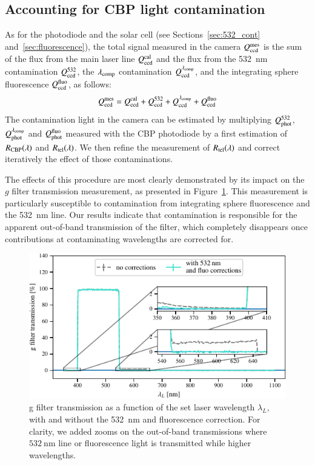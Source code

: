 \subsection{Accounting for CBP light contamination}\label{sec:sd_contaminations}

As for the photodiode and the solar cell (see Sections~\ref{sec:532_cont} and~\ref{sec:fluorescence}), the total signal measured in the \SD camera $Q_{\mathrm{ccd}}^{\mathrm{mes}}$ is the sum of the flux from the main laser line $Q_{\mathrm{ccd}}^{\mathrm{cal}}$ and the flux from the \SI{532}{\nm} contamination $Q_{\mathrm{ccd}}^{532}$, the $\lambda_{\rm comp}$ contamination $Q_{\mathrm{ccd}}^{\lambda_{\rm comp}}$, and the integrating sphere fluorescence $Q_{\mathrm{ccd}}^{\mathrm{fluo}}$, as follows:
\begin{equation}
    Q_{\mathrm{ccd}}^{\mathrm{mes}} = Q_{\mathrm{ccd}}^{\mathrm{cal}} + Q_{\mathrm{ccd}}^{532} + Q_{\mathrm{ccd}}^{\lambda_{\rm comp}} + Q_{\mathrm{ccd}}^{\mathrm{fluo}}
    \label{eq:qccd_mes}
\end{equation}
The contamination light in the \SD camera can be estimated by multiplying $Q_{\mathrm{phot}}^{532}$, $Q_{\mathrm{phot}}^{\lambda_{\rm comp}}$ and $Q_{\mathrm{phot}}^{\mathrm{fluo}}$ measured with the CBP photodiode by a first estimation of $R_{\mathrm{CBP}}(\lambda)$ and $R_{\mathrm{tel}}(\lambda)$. We then refine the measurement of $R_{\mathrm{tel}}(\lambda)$ and correct iteratively the effect of those contaminations.

The effects of this procedure are most clearly demonstrated by its impact on the \SD $g$ filter transmission measurement, as presented in Figure~\ref{fig:g_filter_532}. This measurement is particularly susceptible to contamination from integrating sphere fluorescence and the \SI{532}{\nano\meter} line. Our results indicate that contamination is responsible for the apparent out-of-band transmission of the filter, which completely disappears once contributions at contaminating wavelengths are corrected for.

\begin{figure}[h]
    \centering
    \includegraphics[width=\columnwidth]{fig/g_filter_532.pdf}
    \caption{\SD g filter transmission as a function of the set laser wavelength $\lambda_L$, with and without the \SI{532}{\nm} and fluorescence correction. For clarity, we added zooms on the out-of-band transmissions where $\SI{532}{\nm}$ line or fluorescence light is transmitted while higher wavelengths.}
    \label{fig:g_filter_532}
\end{figure}


